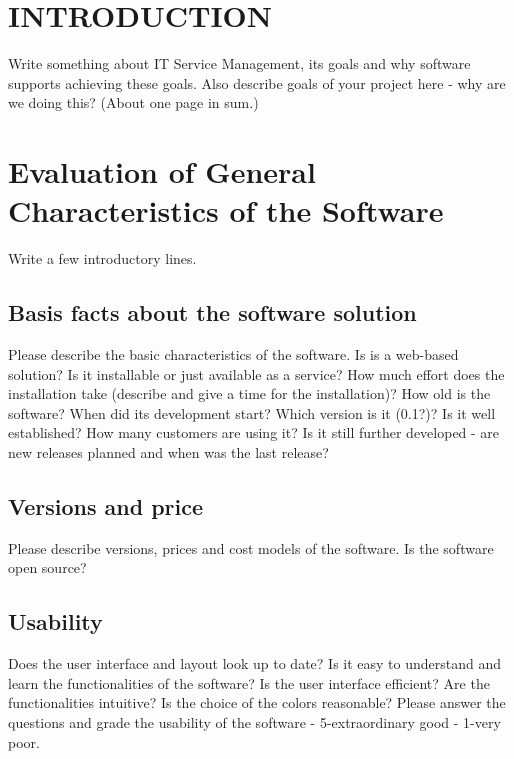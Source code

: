 
\renewcommand{\baselinestretch}{1.2}\normalsize

\chapter{INTRODUCTION}
\label{sec:introduction}

\setcounter{footnote}{1}

Write something about IT Service Management, its goals and why software supports achieving these goals. Also describe goals of your project here - why are we doing this? (About one page in sum.)

\chapter{Evaluation of General Characteristics of the Software}

Write a few introductory lines.

\section{Basis facts about the software solution}

Please describe the basic characteristics of the software. Is is a web-based solution? Is it installable or just available as a service? How much effort does the installation take (describe and give a time for the installation)? How old is the software? When did its development start? Which version is it (0.1?)? Is it well established? How many customers are using it? Is it still further developed - are new releases planned and when was the last release? 

\section{Versions and price}

Please describe versions, prices and cost models of the software. Is the software open source?

\section{Usability}

Does the user interface and layout look up to date? Is it easy to understand and learn the functionalities of the software? Is the user interface efficient? Are the functionalities intuitive? Is the choice of the colors reasonable? Please answer the questions and grade the usability of the software - 5-extraordinary good - 1-very poor.

